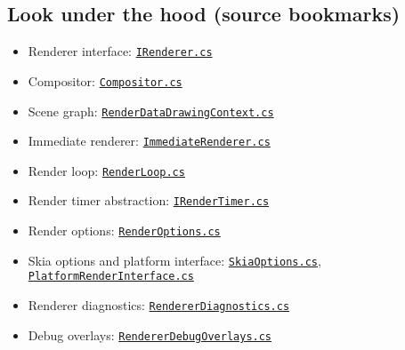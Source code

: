 \subsection{Look under the hood (source
bookmarks)}\label{look-under-the-hood-source-bookmarks-20}

\begin{itemize}
\tightlist
\item
  Renderer interface:
  \href{https://github.com/AvaloniaUI/Avalonia/blob/master/src/Avalonia.Base/Rendering/IRenderer.cs}{\passthrough{\lstinline!IRenderer.cs!}}
\item
  Compositor:
  \href{https://github.com/AvaloniaUI/Avalonia/blob/master/src/Avalonia.Base/Rendering/Composition/Compositor.cs}{\passthrough{\lstinline!Compositor.cs!}}
\item
  Scene graph:
  \href{https://github.com/AvaloniaUI/Avalonia/blob/master/src/Avalonia.Base/Rendering/Composition/Drawing/RenderDataDrawingContext.cs}{\passthrough{\lstinline!RenderDataDrawingContext.cs!}}
\item
  Immediate renderer:
  \href{https://github.com/AvaloniaUI/Avalonia/blob/master/src/Avalonia.Base/Rendering/ImmediateRenderer.cs}{\passthrough{\lstinline!ImmediateRenderer.cs!}}
\item
  Render loop:
  \href{https://github.com/AvaloniaUI/Avalonia/blob/master/src/Avalonia.Base/Rendering/RenderLoop.cs}{\passthrough{\lstinline!RenderLoop.cs!}}
\item
  Render timer abstraction:
  \href{https://github.com/AvaloniaUI/Avalonia/blob/master/src/Avalonia.Base/Rendering/IRenderTimer.cs}{\passthrough{\lstinline!IRenderTimer.cs!}}
\item
  Render options:
  \href{https://github.com/AvaloniaUI/Avalonia/blob/master/src/Avalonia.Base/Media/RenderOptions.cs}{\passthrough{\lstinline!RenderOptions.cs!}}
\item
  Skia options and platform interface:
  \href{https://github.com/AvaloniaUI/Avalonia/blob/master/src/Skia/Avalonia.Skia/SkiaOptions.cs}{\passthrough{\lstinline!SkiaOptions.cs!}},
  \href{https://github.com/AvaloniaUI/Avalonia/blob/master/src/Skia/Avalonia.Skia/PlatformRenderInterface.cs}{\passthrough{\lstinline!PlatformRenderInterface.cs!}}
\item
  Renderer diagnostics:
  \href{https://github.com/AvaloniaUI/Avalonia/blob/master/src/Avalonia.Base/Rendering/RendererDiagnostics.cs}{\passthrough{\lstinline!RendererDiagnostics.cs!}}
\item
  Debug overlays:
  \href{https://github.com/AvaloniaUI/Avalonia/blob/master/src/Avalonia.Base/Rendering/RendererDebugOverlays.cs}{\passthrough{\lstinline!RendererDebugOverlays.cs!}}
\end{itemize}

